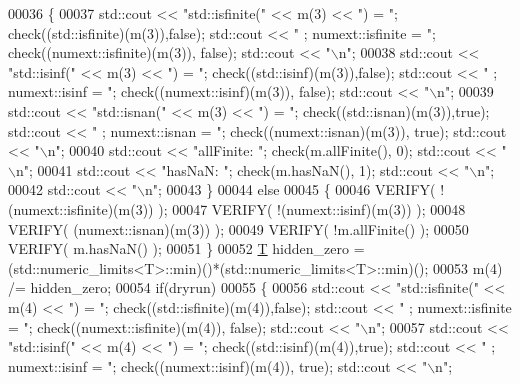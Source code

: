 \begin{DoxyCode}
00036   \{
00037     std::cout << \textcolor{stringliteral}{"std::isfinite("} << m(3) << \textcolor{stringliteral}{") = "}; check((std::isfinite)(m(3)),\textcolor{keyword}{false}); std::cout << \textcolor{stringliteral}{"  ;
       numext::isfinite = "}; check((numext::isfinite)(m(3)), \textcolor{keyword}{false}); std::cout << \textcolor{stringliteral}{"\(\backslash\)n"};
00038     std::cout << \textcolor{stringliteral}{"std::isinf("} << m(3) << \textcolor{stringliteral}{")    = "}; check((std::isinf)(m(3)),\textcolor{keyword}{false});    std::cout << \textcolor{stringliteral}{"  ;
       numext::isinf    = "}; check((numext::isinf)(m(3)), \textcolor{keyword}{false}); std::cout << \textcolor{stringliteral}{"\(\backslash\)n"};
00039     std::cout << \textcolor{stringliteral}{"std::isnan("} << m(3) << \textcolor{stringliteral}{")    = "}; check((std::isnan)(m(3)),\textcolor{keyword}{true});     std::cout << \textcolor{stringliteral}{"  ;
       numext::isnan    = "}; check((numext::isnan)(m(3)), \textcolor{keyword}{true}); std::cout << \textcolor{stringliteral}{"\(\backslash\)n"};
00040     std::cout << \textcolor{stringliteral}{"allFinite: "}; check(m.allFinite(), 0); std::cout << \textcolor{stringliteral}{"\(\backslash\)n"};
00041     std::cout << \textcolor{stringliteral}{"hasNaN:    "}; check(m.hasNaN(), 1);    std::cout << \textcolor{stringliteral}{"\(\backslash\)n"};
00042     std::cout << \textcolor{stringliteral}{"\(\backslash\)n"};
00043   \}
00044   \textcolor{keywordflow}{else}
00045   \{
00046     VERIFY( !(numext::isfinite)(m(3)) );
00047     VERIFY( !(numext::isinf)(m(3)) );
00048     VERIFY(  (numext::isnan)(m(3)) );
00049     VERIFY( !m.allFinite() );
00050     VERIFY(  m.hasNaN() );
00051   \}
00052   \hyperlink{group___sparse_core___module}{T} hidden\_zero = (std::numeric\_limits<T>::min)()*(std::numeric\_limits<T>::min)();
00053   m(4) /= hidden\_zero;
00054   \textcolor{keywordflow}{if}(dryrun)
00055   \{
00056     std::cout << \textcolor{stringliteral}{"std::isfinite("} << m(4) << \textcolor{stringliteral}{") = "}; check((std::isfinite)(m(4)),\textcolor{keyword}{false}); std::cout << \textcolor{stringliteral}{"  ;
       numext::isfinite = "}; check((numext::isfinite)(m(4)), \textcolor{keyword}{false}); std::cout << \textcolor{stringliteral}{"\(\backslash\)n"};
00057     std::cout << \textcolor{stringliteral}{"std::isinf("} << m(4) << \textcolor{stringliteral}{")    = "}; check((std::isinf)(m(4)),\textcolor{keyword}{true});     std::cout << \textcolor{stringliteral}{"  ;
       numext::isinf    = "}; check((numext::isinf)(m(4)), \textcolor{keyword}{true}); std::cout << \textcolor{stringliteral}{"\(\backslash\)n"};

\end{DoxyCode}
